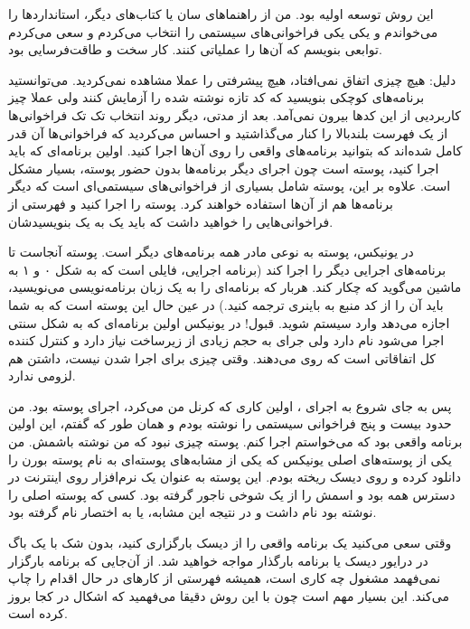 این روش توسعه‌ اولیه بود. من از راهنماهای سان یا کتاب‌های دیگر،
استانداردها را می‌خواندم و یکی یکی فراخوانی‌های سیستمی را انتخاب می‌کردم
و سعی می‌کردم توابعی بنویسم که آن‌ها را عملیاتی کنند. کار سخت و
طاقت‌فرسایی بود.

دلیل: هیچ چیزی اتفاق نمی‌افتاد، هیچ پیشرفتی را عملا مشاهده
نمی‌کردید. می‌توانستید برنامه‌های کوچکی بنویسید که کد تازه نوشته شده را
آزمایش کنند ولی عملا چیز کاربردیی از این کدها بیرون نمی‌آمد. بعد از
مدتی، دیگر روند انتخاب تک تک فراخوانی‌ها از یک فهرست بلندبالا را کنار
می‌گذاشتید و احساس می‌کردید که فراخوانی‌ها آن قدر کامل شده‌اند که بتوانید
برنامه‌های واقعی را روی آن‌ها اجرا کنید. اولین برنامه‌ای که باید اجرا
کنید، پوسته است چون
اجرای دیگر برنامه‌ها بدون حضور پوسته، بسیار مشکل است. علاوه بر این،
پوسته شامل بسیاری از فراخوانی‌های سیستمی‌ای است که دیگر برنامه‌ها هم از
آن‌ها استفاده خواهند کرد. پوسته را اجرا کنید و فهرستی از فراخوانی‌هایی
را خواهید داشت که باید یک به یک بنویسیدشان.

در یونیکس، پوسته به نوعی مادر همه برنامه‌های دیگر است. پوسته آنجاست تا
برنامه‌های اجرایی دیگر را اجرا کند (برنامه اجرایی، فایلی است که به شکل
۰ و ۱ به ماشین می‌گوید که چکار کند. هربار که برنامه‌ای را به یک زبان
برنامه‌نویسی می‌نویسید، باید آن را از کد منبع به باینری ترجمه کنید.) در
عین حال این پوسته است که به شما اجازه می‌دهد وارد سیستم شوید. قبول! در
یونیکس اولین برنامه‌ای که به شکل سنتی اجرا می‌شود  نام دارد
ولی جرای  به حجم زیادی از زیرساخت نیاز دارد و کنترل کننده
کل اتفاقاتی است که روی می‌دهند. وقتی چیزی برای اجرا شدن نیست، داشتن
 هم لزومی ندارد.

پس به جای شروع به اجرای ، اولین کاری که
کرنل من می‌کرد، اجرای پوسته بود. من حدود بیست و پنج
فراخوانی سیستمی را نوشته بودم و همان طور که گفتم، این اولین برنامه‌
واقعی بود که می‌خواستم اجرا کنم. پوسته چیزی نبود که من نوشته‌ باشمش. من
یکی از پوسته‌های اصلی یونیکس که یکی از مشابه‌های پوسته‌ای به نام پوسته
بورن را دانلود کرده و روی دیسک ریخته بودم. این
پوسته به عنوان یک نرم‌افزار روی اینترنت در دسترس همه بود و اسمش را از
یک شوخی ناجور گرفته بود. کسی که پوسته اصلی را نوشته بود 
نام داشت و در نتیجه این مشابه، یا به اختصار  نام گرفته بود.

وقتی سعی‌ می‌کنید یک برنامه واقعی را از دیسک بارگزاری کنید، بدون شک با
یک باگ در درایور دیسک یا برنامه بارگذار مواجه خواهید شد. از آن‌جایی که
برنامه بارگزار نمی‌فهمد مشغول چه کاری است، همیشه فهرستی از کارهای در
حال اقدام را چاپ می‌کند. این بسیار مهم است چون با این روش دقیقا می‌فهمید
که اشکال در کجا بروز کرده است.

